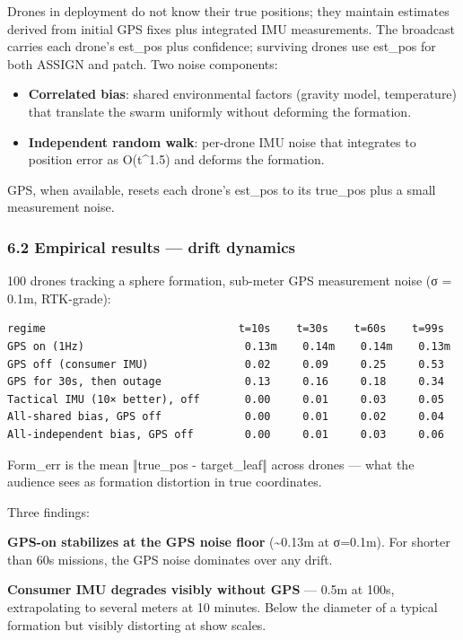 Drones in deployment do not know their true positions; they maintain
estimates derived from initial GPS fixes plus integrated IMU
measurements. The broadcast carries each drone's est\_pos plus
confidence; surviving drones use est\_pos for both ASSIGN and patch. Two
noise components:

\begin{itemize}
\tightlist
\item
  \textbf{Correlated bias}: shared environmental factors (gravity model,
  temperature) that translate the swarm uniformly without deforming the
  formation.
\item
  \textbf{Independent random walk}: per-drone IMU noise that integrates
  to position error as O(t\^{}1.5) and deforms the formation.
\end{itemize}

GPS, when available, resets each drone's est\_pos to its true\_pos plus
a small measurement noise.

\subsubsection{6.2 Empirical results --- drift
dynamics}\label{empirical-results-drift-dynamics}

100 drones tracking a sphere formation, sub-meter GPS measurement noise
(σ = 0.1m, RTK-grade):

\begin{verbatim}
regime                              t=10s    t=30s    t=60s    t=99s
GPS on (1Hz)                         0.13m    0.14m    0.14m    0.13m
GPS off (consumer IMU)               0.02     0.09     0.25     0.53
GPS for 30s, then outage             0.13     0.16     0.18     0.34
Tactical IMU (10× better), off       0.00     0.01     0.03     0.05
All-shared bias, GPS off             0.00     0.01     0.02     0.04
All-independent bias, GPS off        0.00     0.01     0.03     0.06
\end{verbatim}

Form\_err is the mean ‖true\_pos - target\_leaf‖ across drones --- what
the audience sees as formation distortion in true coordinates.

Three findings:

\textbf{GPS-on stabilizes at the GPS noise floor} (\textasciitilde0.13m
at σ=0.1m). For shorter than 60s missions, the GPS noise dominates over
any drift.

\textbf{Consumer IMU degrades visibly without GPS} --- 0.5m at 100s,
extrapolating to several meters at 10 minutes. Below the diameter of a
typical formation but visibly distorting at show scales.

